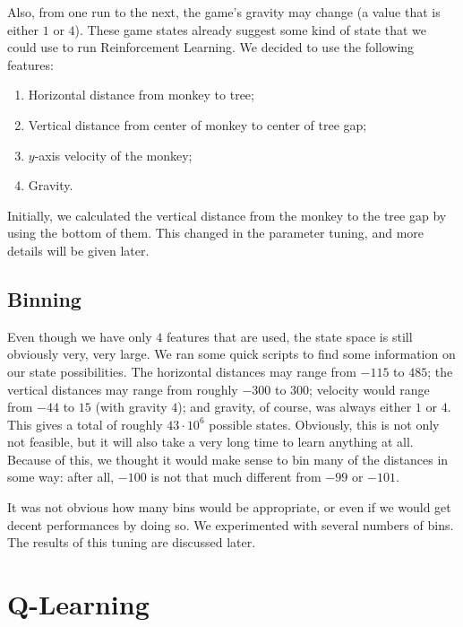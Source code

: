 \documentclass[10pt]{article}
\begin{document}
\medskip

Also, from one run to the next, the game's gravity may change (a value that
is either $1$ or $4$). These game states already suggest some kind of state
that we could use to run Reinforcement Learning. We decided to use the
following features:

\medskip

\begin{enumerate}
\item Horizontal distance from monkey to tree;
\item Vertical distance from center of monkey to center of tree gap;
\item $y$-axis velocity of the monkey;
\item Gravity.
\end{enumerate}

\medskip

Initially, we calculated the vertical distance from the monkey to the tree
gap by using the bottom of them. This changed in the parameter tuning, and
more details will be given later.

\subsection{Binning}

Even though we have only $4$ features that are used, the state space is still
obviously very, very large. We ran some quick scripts to find some information
on our state possibilities. The horizontal distances may range from $-115$
to $485$; the vertical distances may range from roughly $-300$ to $300$;
velocity would range from $-44$ to $15$ (with gravity $4$); and gravity,
of course, was always either $1$ or $4$. This gives a total of roughly 
$43 \cdot 10^6$ possible states. Obviously, this is not only not feasible,
but it will also take a very long time to learn anything at all. Because of 
this, we thought it would make sense to bin many of the distances in some
way: after all, $-100$ is not that much different from $-99$ or $-101$.

\medskip

It was not obvious how many bins would be appropriate, or even if we would get
decent performances by doing so. We experimented with several numbers of
bins. The results of this tuning are discussed later.

\section{Q-Learning}
\end{document}
